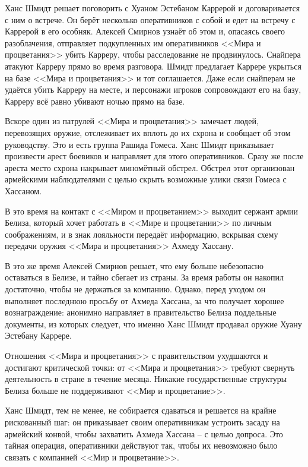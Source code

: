 \documentclass{article}
\begin{document}
Ханс Шмидт решает поговорить с Хуаном Эстебаном Каррерой и
договаривается с ним о встрече. Он берёт несколько оперативников с собой
и едет на встречу с Каррерой в его особняк. Алексей Смирнов узнаёт об
этом и, опасаясь своего разоблачения, отправляет подкупленных им
оперативников <<Мира и процветания>> убить Карреру, чтобы расследование не
продвинулось. Снайпера атакуют Карреру прямо во время разговора. Шмидт
предлагает Каррере укрыться на базе <<Мира и процветания>> и тот
соглашается. Даже если снайперам не удаётся убить Карреру на месте, и
персонажи игроков сопровождают его на базу, Карреру всё равно убивают
ночью прямо на базе.

Вскоре один из патрулей <<Мира и процветания>> замечает людей, перевозящих
оружие, отслеживает их вплоть до их схрона и сообщает об этом
руководству. Это и есть группа Рашида Гомеса. Ханс Шмидт приказывает
произвести арест боевиков и направляет для этого оперативников. Сразу же
после ареста место схрона накрывает миномётный обстрел. Обстрел этот
организован армейскими наблюдателями с целью скрыть возможные улики
связи Гомеса с Хассаном.

В это время на контакт с <<Миром и процветанием>> выходит сержант армии
Белиза, который хочет работать в <<Мире и процветании>> по личным
соображениям, и в знак лояльности передаёт информацию, вскрывая схему
передачи оружия <<Мира и процветания>> Ахмеду Хассану.

В это же время Алексей Смирнов решает, что ему больше небезопасно
оставаться в Белизе, и тайно сбегает из страны. За время работы он
накопил достаточно, чтобы не держаться за компанию. Однако, перед уходом
он выполняет последнюю просьбу от Ахмеда Хассана, за что получает
хорошее вознаграждение: анонимно направляет в правительство Белиза
поддельные документы, из которых следует, что именно Ханс Шмидт продавал
оружие Хуану Эстебану Каррере.

Отношения <<Мира и процветания>> с правительством ухудшаются и достигают
критической точки: от <<Мира и процветания>> требуют свернуть деятельность
в стране в течение месяца. Никакие государственные структуры Белиза
больше не поддерживают <<Мир и процветание>>.

Ханс Шмидт, тем не менее, не собирается сдаваться и решается на крайне
рискованный шаг: он приказывает своим оперативникам устроить засаду на
армейский конвой, чтобы захватить Ахмеда Хассана -- с целью допроса. Это
тайная операция, оперативники действуют так, чтобы их невозможно было
связать с компанией <<Мир и процветание>>.
\end{document}
